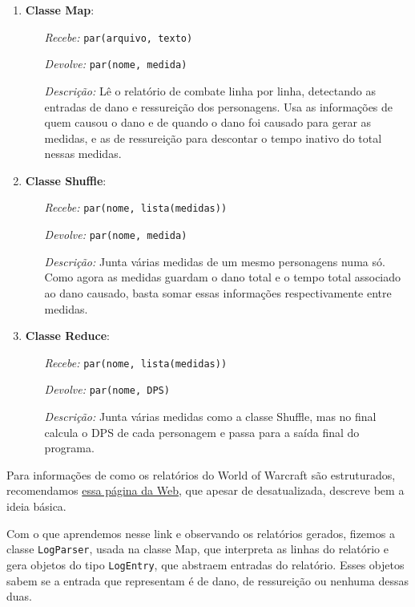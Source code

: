\documentclass[a4paper,11pt]{article}
\begin{document}
  \begin{enumerate}
    \item
      \textbf{Classe Map}:
      \begin{itemize}
        \item[\textit{Recebe:}] \verb$par(arquivo, texto)$
        \item[\textit{Devolve:}] \verb$par(nome, medida)$
        \item[\textit{Descrição:}]
          Lê o relatório de combate linha por linha, detectando as entradas de
          dano e ressureição dos personagens. Usa as informações de quem causou
          o dano e de quando o dano foi causado para gerar as medidas, e as de
          ressureição para descontar o tempo inativo do total nessas medidas.
      \end{itemize}
    \item
      \textbf{Classe Shuffle}:
      \begin{itemize}
        \item[\textit{Recebe:}] \verb$par(nome, lista(medidas))$
        \item[\textit{Devolve:}] \verb$par(nome, medida)$
        \item[\textit{Descrição:}]
          Junta várias medidas de um mesmo personagens numa só. Como agora as
          medidas guardam o dano total e o tempo total associado ao dano
          causado, basta somar essas informações respectivamente entre medidas.
      \end{itemize}
    \item
      \textbf{Classe Reduce}:
      \begin{itemize}
        \item[\textit{Recebe:}] \verb$par(nome, lista(medidas))$
        \item[\textit{Devolve:}] \verb$par(nome, DPS)$
        \item[\textit{Descrição:}]
          Junta várias medidas como a classe Shuffle, mas no final calcula o
          DPS de cada personagem e passa para a saída final do programa.
      \end{itemize}
  \end{enumerate}
  
  Para informações de como os relatórios do World of Warcraft são estruturados,
  recomendamos \href{http://www.wowwiki.com/API_COMBAT_LOG_EVENT}{essa página da
  Web}, que apesar de desatualizada, descreve bem a ideia básica.
  
  Com o que aprendemos nesse link e observando os relatórios gerados, fizemos a
  classe \verb$LogParser$, usada na classe Map, que interpreta as linhas do
  relatório e gera objetos do tipo \verb$LogEntry$, que abstraem entradas do
  relatório. Esses objetos sabem se a entrada que representam é de dano, de
  ressureição ou nenhuma dessas duas.
  
\end{document}
